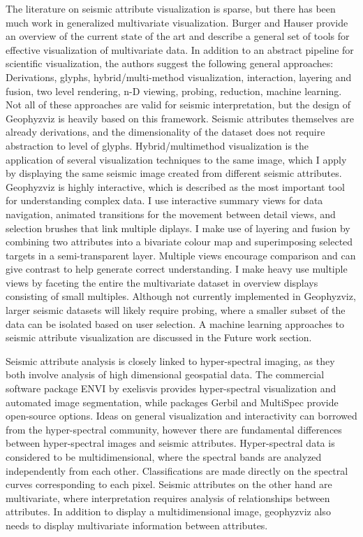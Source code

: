 \documentclass[journal]{vgtc}                %
\begin{document}
The literature on seismic attribute visualization is sparse, but there has been much work in
generalized multivariate visualization. Burger and Hauser \cite{fuchs-vom-2009} provide an overview of the current
state of the art and describe a general set of tools for effective visualization of multivariate data. In addition to
an abstract pipeline for scientific visualization, the authors suggest the following general approaches:
Derivations, glyphs, hybrid/multi-method visualization, interaction, layering and fusion, two level rendering, 
n-D viewing, probing, reduction, machine learning. Not all of these approaches are valid for seismic interpretation,
but the design of Geophyzviz is heavily based on this framework. Seismic attributes themselves are already derivations,
and the dimensionality of the dataset does not require abstraction to level of glyphs. Hybrid/multimethod visualization
is the application of several visualization techniques to the same image, which I apply by displaying the same seismic image 
created from different seismic attributes. Geophyzviz is highly interactive, which is described as the most important tool
for understanding complex data. I use interactive summary views for data navigation, animated transitions for the movement
between detail views, and selection brushes that link multiple diplays. I make use of layering and fusion by combining two attributes
into a bivariate colour map and superimposing selected targets in a semi-transparent layer. Multiple views encourage comparison and
can give contrast to help generate correct understanding. I make heavy use multiple views by faceting the entire the multivariate
dataset in overview displays consisting of small multiples. Although not currently implemented in Geophyzviz, larger seismic datasets will
likely require probing, where a smaller subset of the data can be isolated based on user selection. A machine learning approaches
to seismic attribute visualization are discussed in the Future work section.


Seismic attribute analysis is closely linked to hyper-spectral imaging, as they both involve
analysis of high dimensional geospatial data. The commercial software package ENVI \cite{itt-sol} by
exelisvis provides hyper-spectral visualization and automated image segmentation, while
packages Gerbil \cite{gerbil} and MultiSpec \cite{multispec} provide open-source options. Ideas on general visualization
and interactivity can borrowed from the hyper-spectral community, however there are fundamental
differences between hyper-spectral images and seismic attributes. Hyper-spectral data is considered
to be multidimensional, where the spectral bands are analyzed independently from each other.
Classifications are made directly on the spectral curves corresponding to each pixel. Seismic
attributes on the other hand are multivariate, where interpretation requires analysis of
relationships between attributes. In addition to display a multidimensional image, geophyzviz
also needs to display multivariate information between attributes.
\end{document}
